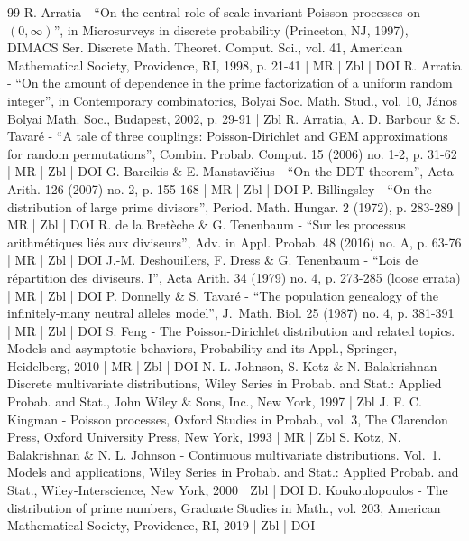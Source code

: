 \documentclass[10pt]{amsart}
\theoremstyle{plain}
\theoremstyle{definition}
\begin{document}
\begin{thebibliography}{99}
R. Arratia - “On the central role of scale invariant Poisson processes on $(0,\infty )$”, in Microsurveys in discrete probability (Princeton, NJ, 1997), DIMACS Ser. Discrete Math. Theoret. Comput. Sci., vol. 41, American Mathematical Society, Providence, RI, 1998, p. 21-41 | MR | Zbl | DOI
R. Arratia - “On the amount of dependence in the prime factorization of a uniform random integer”, in Contemporary combinatorics, Bolyai Soc. Math. Stud., vol. 10, János Bolyai Math. Soc., Budapest, 2002, p. 29-91 | Zbl
R. Arratia, A. D. Barbour \& S. Tavaré - “A tale of three couplings: Poisson-Dirichlet and GEM approximations for random permutations”, Combin. Probab. Comput. 15 (2006) no. 1-2, p. 31-62 | MR | Zbl | DOI
G. Bareikis \& E. Manstavičius - “On the DDT theorem”, Acta Arith. 126 (2007) no. 2, p. 155-168 | MR | Zbl | DOI
P. Billingsley - “On the distribution of large prime divisors”, Period. Math. Hungar. 2 (1972), p. 283-289 | MR | Zbl | DOI
R. de la Bretèche \& G. Tenenbaum - “Sur les processus arithmétiques liés aux diviseurs”, Adv. in Appl. Probab. 48 (2016) no. A, p. 63-76 | MR | Zbl | DOI
J.-M. Deshouillers, F. Dress \& G. Tenenbaum - “Lois de répartition des diviseurs. I”, Acta Arith. 34 (1979) no. 4, p. 273-285 (loose errata) | MR | Zbl | DOI
P. Donnelly \& S. Tavaré - “The population genealogy of the infinitely-many neutral alleles model”, J. Math. Biol. 25 (1987) no. 4, p. 381-391 | MR | Zbl | DOI
S. Feng - The Poisson-Dirichlet distribution and related topics. Models and asymptotic behaviors, Probability and its Appl., Springer, Heidelberg, 2010 | MR | Zbl | DOI
N. L. Johnson, S. Kotz \& N. Balakrishnan - Discrete multivariate distributions, Wiley Series in Probab. and Stat.: Applied Probab. and Stat., John Wiley \& Sons, Inc., New York, 1997 | Zbl
J. F. C. Kingman - Poisson processes, Oxford Studies in Probab., vol. 3, The Clarendon Press, Oxford University Press, New York, 1993 | MR | Zbl
S. Kotz, N. Balakrishnan \& N. L. Johnson - Continuous multivariate distributions. Vol. 1. Models and applications, Wiley Series in Probab. and Stat.: Applied Probab. and Stat., Wiley-Interscience, New York, 2000 | Zbl | DOI
D. Koukoulopoulos - The distribution of prime numbers, Graduate Studies in Math., vol. 203, American Mathematical Society, Providence, RI, 2019 | Zbl | DOI

\end{thebibliography}
\end{document}
